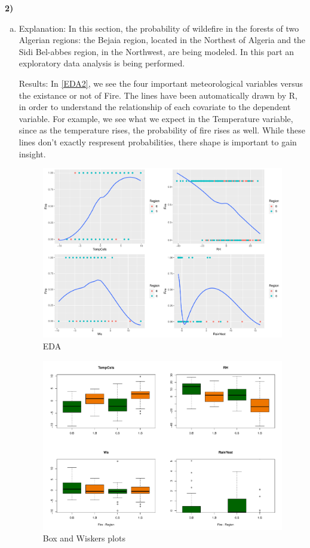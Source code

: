 \documentclass[12pt,a4paper]{article}
\begin{document}
\noindent\textbf{2)}
\begin{enumerate}[(a)]

\item
Explanation: In this section, the probability of wildefire in the forests of two Algerian regions: the Bejaia region, located in the Northest of Algeria and the Sidi Bel-abbes region, in the Northwest, are being modeled. In this part an exploratory data analysis is being performed.

Results: In \autoref{EDA2}, we see the four important meteorological variables versus the existance or not of Fire. The lines have been automatically drawn by \textsf{R}, in order to understand the relationship of each covariate to the dependent variable. For example, we see what we expect in the Temperature variable, since as the temperature rises, the probability of fire rises as well. While these lines don't exactly respresent probabilities, there shape is important to gain insight.


\begin{figure}[h]
    \centering
    \includegraphics[width=0.6\linewidth]{figures/Rplot07.pdf}
    \caption{EDA}
    \label{EDA2}
\end{figure}

\begin{figure}[h]
    \centering
    \includegraphics[width=0.6\linewidth]{figures/Rplot08.pdf}
    \caption{Box and Wiskers plots}
    \label{boxplots}
\end{figure}


\end{enumerate}
\end{document}
